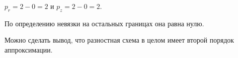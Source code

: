 $ p_r = 2 - 0 = 2 $ и $ p_z = 2 - 0 = 2 $.

По определению невязки на остальных границах она равна нулю.

Можно сделать вывод, что разностная схема в целом имеет второй порядок аппроксимации.
